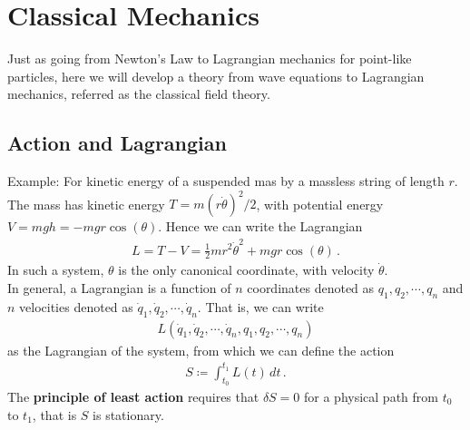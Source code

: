 \documentclass[11pt, onesided]{book}
\theoremstyle{break}
\theoremstyle{break}
\newcommand{\example}{\color{green}Example: \color{black}}
\begin{document}
\tableofcontents
\hfill\break
\hfill\break
\hfill\break
 

\newpage
\chapter{Classical Mechanics}
\quad Just as going from Newton's Law to Lagrangian mechanics for point-like particles, here we will develop a theory from wave equations to Lagrangian mechanics, referred as the classical field theory.\\

\section[Action and Lagrangian]{\color{red} Action and Lagrangian\color{black}}
\example For kinetic energy of a suspended mas by a massless string of length $r$. The mass has kinetic energy $T = m(r\dot{\theta})^2/2$, with potential energy $V = mgh = -mgr\cos(\theta)$. Hence we can write the Lagrangian
\begin{align*}
L = T-V = \frac{1}{2}mr^2 \dot{\theta}^2 + mgr \cos(\theta)\, .
\end{align*}
In such a system, $\theta$ is the only canonical coordinate, with velocity $\dot{\theta}$. \\

In general, a Lagrangian is a function of $n$ coordinates denoted as $q_1,q_2,\cdots, q_n$ and $n$ velocities denoted as $\dot{q}_1, \dot{q}_2,\cdots, \dot{q}_n$. That is, we can write
\begin{align}
L(\dot{q}_1,\dot{q}_2,\cdots, \dot{q}_n, q_1,q_2,\cdots, q_n)
\end{align} 
as the Lagrangian of the system, from which we can define the action 
\begin{align}
S\coloneqq \int_{t_0}^{t_1} L(t) \, dt\, .
\end{align}
The \textbf{principle of least action} requires that $\delta S = 0$ for a physical path from $t_0$ to $t_1$, that is $S$ is stationary. \\
\end{document}
